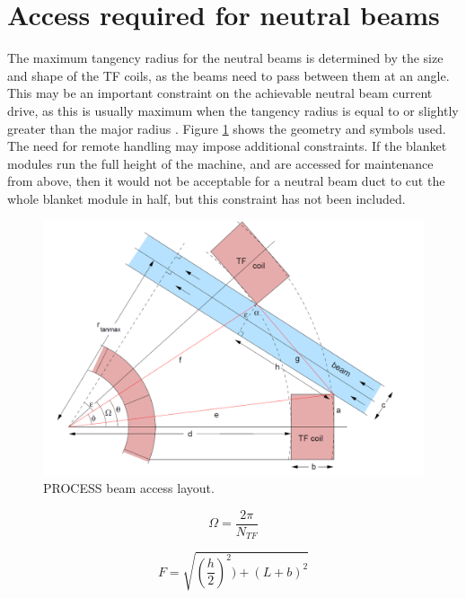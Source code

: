 \documentclass[hidelinks]{article}
\numberwithin{equation}{section}
\begin{document}
    \section{Access required for neutral beams}

    The maximum tangency radius for the neutral beams is determined by the size and 
    shape of the TF coils, as the beams need to pass between them at an angle. This 
    may be an important constraint on the achievable neutral beam current drive, as 
    this is usually maximum when the tangency radius is equal to or slightly greater 
    than the major radius \cite{kovari2014, Surrey2012}.  Figure \ref{fig: beam-access} 
    shows the geometry and symbols used.  The need for remote handling may impose 
    additional constraints.  If the blanket modules run the full height of the machine, 
    and are accessed for maintenance from above, then it would not be acceptable for a 
    neutral beam duct to cut the whole blanket module in half, but this constraint has 
    not been included.

    \begin{figure}[!t]
    \centering
    \includegraphics[scale=0.4]{figures/beam_access.PNG}
    \caption{PROCESS beam access layout.} \label{fig: beam-access}
    \end{figure}

    \begin{equation}\label{eq: beam-a-omega}
        \Omega = \frac{2\pi}{N_{TF}}
    \end{equation}

    \begin{equation}\label{eq: beam-a-f}
        F = \sqrt{(\frac{h}{2})^2) + (L + b)^2 }
    \end{equation}
\end{document}
